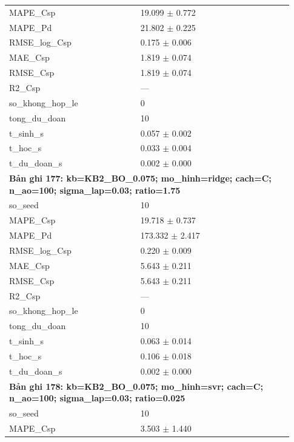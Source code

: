 \begin{longtable}{p{0.43\linewidth}p{0.50\linewidth}}
MAPE\_\allowbreak Csp & 19.099 $\pm$ 0.772 \\
MAPE\_\allowbreak Pd & 21.802 $\pm$ 0.225 \\
RMSE\_\allowbreak log\_\allowbreak Csp & 0.175 $\pm$ 0.006 \\
MAE\_\allowbreak Csp & 1.819 $\pm$ 0.074 \\
RMSE\_\allowbreak Csp & 1.819 $\pm$ 0.074 \\
R2\_\allowbreak Csp & — \\
so\_\allowbreak khong\_\allowbreak hop\_\allowbreak le & 0 \\
tong\_\allowbreak du\_\allowbreak doan & 10 \\
t\_\allowbreak sinh\_\allowbreak s & 0.057 $\pm$ 0.002 \\
t\_\allowbreak hoc\_\allowbreak s & 0.033 $\pm$ 0.004 \\
t\_\allowbreak du\_\allowbreak doan\_\allowbreak s & 0.002 $\pm$ 0.000 \\
\midrule
\multicolumn{2}{p{0.95\linewidth}}{\textbf{Bản ghi 177: kb=KB2\_BO\_0.075; mo\_hinh=ridge; cach=C; n\_ao=100; sigma\_lap=0.03; ratio=1.75}} \\
so\_\allowbreak seed & 10 \\
MAPE\_\allowbreak Csp & 19.718 $\pm$ 0.737 \\
MAPE\_\allowbreak Pd & 173.332 $\pm$ 2.417 \\
RMSE\_\allowbreak log\_\allowbreak Csp & 0.220 $\pm$ 0.009 \\
MAE\_\allowbreak Csp & 5.643 $\pm$ 0.211 \\
RMSE\_\allowbreak Csp & 5.643 $\pm$ 0.211 \\
R2\_\allowbreak Csp & — \\
so\_\allowbreak khong\_\allowbreak hop\_\allowbreak le & 0 \\
tong\_\allowbreak du\_\allowbreak doan & 10 \\
t\_\allowbreak sinh\_\allowbreak s & 0.063 $\pm$ 0.014 \\
t\_\allowbreak hoc\_\allowbreak s & 0.106 $\pm$ 0.018 \\
t\_\allowbreak du\_\allowbreak doan\_\allowbreak s & 0.002 $\pm$ 0.000 \\
\midrule
\multicolumn{2}{p{0.95\linewidth}}{\textbf{Bản ghi 178: kb=KB2\_BO\_0.075; mo\_hinh=svr; cach=C; n\_ao=100; sigma\_lap=0.03; ratio=0.025}} \\
so\_\allowbreak seed & 10 \\
MAPE\_\allowbreak Csp & 3.503 $\pm$ 1.440 \\

\end{longtable}
